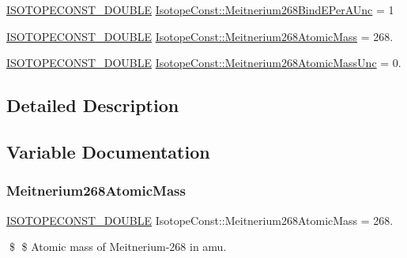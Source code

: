 \begin{DoxyCompactItemize}
\mbox{\hyperlink{group___isotope_const-_macros_ga8f45a7272ce02c0b4c65c44636ed719a}{I\+S\+O\+T\+O\+P\+E\+C\+O\+N\+S\+T\+\_\+\+D\+O\+U\+B\+LE}} \mbox{\hyperlink{group___isotope_const-_meitnerium-_mt268_gab8ed0f051d068071778a30163440f07d}{Isotope\+Const\+::\+Meitnerium268\+Bind\+E\+Per\+A\+Unc}} = 1
\item 
\mbox{\hyperlink{group___isotope_const-_macros_ga8f45a7272ce02c0b4c65c44636ed719a}{I\+S\+O\+T\+O\+P\+E\+C\+O\+N\+S\+T\+\_\+\+D\+O\+U\+B\+LE}} \mbox{\hyperlink{group___isotope_const-_meitnerium-_mt268_gaa8acb29140111031b309a0d078fe9400}{Isotope\+Const\+::\+Meitnerium268\+Atomic\+Mass}} = 268.
\item 
\mbox{\hyperlink{group___isotope_const-_macros_ga8f45a7272ce02c0b4c65c44636ed719a}{I\+S\+O\+T\+O\+P\+E\+C\+O\+N\+S\+T\+\_\+\+D\+O\+U\+B\+LE}} \mbox{\hyperlink{group___isotope_const-_meitnerium-_mt268_ga05fa603dc176b0e4f464b14f53a3845e}{Isotope\+Const\+::\+Meitnerium268\+Atomic\+Mass\+Unc}} = 0.
\end{DoxyCompactItemize}


\subsection{Detailed Description}


\subsection{Variable Documentation}
\mbox{\label{group___isotope_const-_meitnerium-_mt268_gaa8acb29140111031b309a0d078fe9400}} 
\subsubsection{\texorpdfstring{Meitnerium268\+Atomic\+Mass}{Meitnerium268AtomicMass}}
{\footnotesize\ttfamily \mbox{\hyperlink{group___isotope_const-_macros_ga8f45a7272ce02c0b4c65c44636ed719a}{I\+S\+O\+T\+O\+P\+E\+C\+O\+N\+S\+T\+\_\+\+D\+O\+U\+B\+LE}} Isotope\+Const\+::\+Meitnerium268\+Atomic\+Mass = 268.}

\$ \$ Atomic mass of Meitnerium-\/268 in amu. \mbox{\label{group___isotope_const-_meitnerium-_mt268_ga05fa603dc176b0e4f464b14f53a3845e}} 
